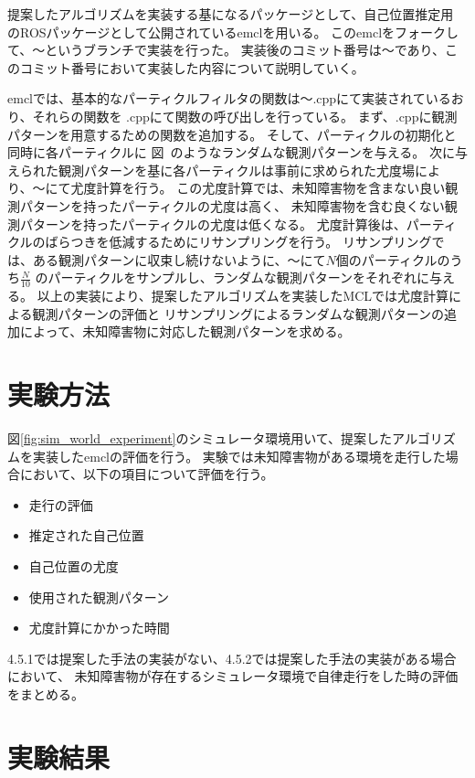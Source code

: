 提案したアルゴリズムを実装する基になるパッケージとして、自己位置推定用
のROSパッケージとして公開されているemclを用いる。
このemclをフォークして、〜というブランチで実装を行った。
実装後のコミット番号は〜であり、このコミット番号において実装した内容について説明していく。

emclでは、基本的なパーティクルフィルタの関数は〜.cppにて実装されているおり、それらの関数を
.cppにて関数の呼び出しを行っている。
まず、.cppに観測パターンを用意するための関数を追加する。
そして、パーティクルの初期化と同時に各パーティクルに
図~のようなランダムな観測パターンを与える。
次に与えられた観測パターンを基に各パーティクルは事前に求められた尤度場により、〜にて尤度計算を行う。
この尤度計算では、未知障害物を含まない良い観測パターンを持ったパーティクルの尤度は高く、
未知障害物を含む良くない観測パターンを持ったパーティクルの尤度は低くなる。
尤度計算後は、パーティクルのばらつきを低減するためにリサンプリングを行う。
リサンプリングでは、ある観測パターンに収束し続けないように、〜にて$N$個のパーティクルのうち$\frac{N}{10}$
のパーティクルをサンプルし、ランダムな観測パターンをそれぞれに与える。
以上の実装により、提案したアルゴリズムを実装したMCLでは尤度計算による観測パターンの評価と
リサンプリングによるランダムな観測パターンの追加によって、未知障害物に対応した観測パターンを求める。

\section{実験方法}

図\ref{fig:sim_world_experiment}のシミュレータ環境用いて、提案したアルゴリズムを実装したemclの評価を行う。
実験では未知障害物がある環境を走行した場合において、以下の項目について評価を行う。
\begin{itemize}
  \item 走行の評価
  \item 推定された自己位置
  \item 自己位置の尤度
  \item 使用された観測パターン
  \item 尤度計算にかかった時間
\end{itemize}
4.5.1では提案した手法の実装がない、4.5.2では提案した手法の実装がある場合において、
未知障害物が存在するシミュレータ環境で自律走行をした時の評価をまとめる。

\section{実験結果}

